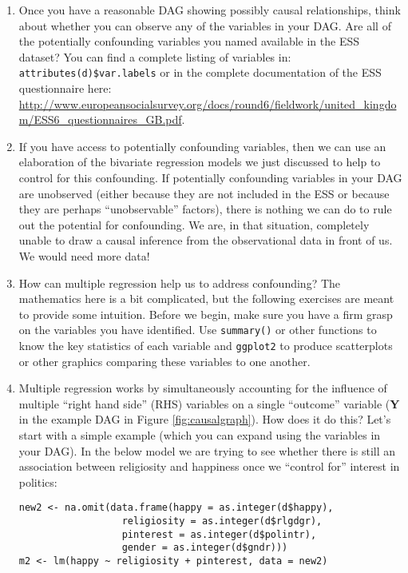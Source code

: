 \documentclass[a4paper,12pt]{article}
\begin{document}
\begin{enumerate}
\item Once you have a reasonable DAG showing possibly causal relationships, think about whether you can observe any of the variables in your DAG. Are all of the potentially confounding variables you named available in the ESS dataset? You can find a complete listing of variables in: \texttt{attributes(d)\$var.labels} or in the complete documentation of the ESS questionnaire here: \url{http://www.europeansocialsurvey.org/docs/round6/fieldwork/united_kingdom/ESS6_questionnaires_GB.pdf}.

\item If you have access to potentially confounding variables, then we can use an elaboration of the bivariate regression models we just discussed to help to control for this confounding. If potentially confounding variables in your DAG are unobserved (either because they are not included in the ESS or because they are perhaps ``unobservable'' factors), there is nothing we can do to rule out the potential for confounding. We are, in that situation, completely unable to draw a causal inference from the observational data in front of us. We would need more data!

\item How can multiple regression help us to address confounding? The mathematics here is a bit complicated, but the following exercises are meant to provide some intuition. Before we begin, make sure you have a firm grasp on the variables you have identified. Use \texttt{summary()} or other functions to know the key statistics of each variable and \texttt{ggplot2} to produce scatterplots or other graphics comparing these variables to one another.

\item Multiple regression works by simultaneously accounting for the influence of multiple ``right hand side'' (RHS) variables on a single ``outcome'' variable (\textbf{Y} in the example DAG in Figure \ref{fig:causalgraph}). How does it do this? Let's start with a simple example (which you can expand using the variables in your DAG). In the below model we are trying to see whether there is still an association between religiosity and happiness once we ``control for'' interest in politics:

\begin{verbatim}
new2 <- na.omit(data.frame(happy = as.integer(d$happy),
                  religiosity = as.integer(d$rlgdgr),
                  pinterest = as.integer(d$polintr),
                  gender = as.integer(d$gndr)))
m2 <- lm(happy ~ religiosity + pinterest, data = new2)
\end{verbatim}


\end{enumerate}
\end{document}

